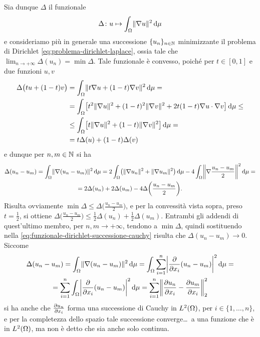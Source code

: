 Sia dunque $\Delta$ il funzionale
\begin{equation}
    \Delta\colon u\mapsto \int_\Omega\norm{\grad u}^2\,\dd\mu
\end{equation}
e consideriamo più in generale una successione $\{u_n\}_{n\in\N}$ minimizzante il problema di Dirichlet \eqref{eq:problema-dirichlet-laplace}, ossia tale che $\lim_{n\to +\infty}\Delta(u_n)=\min\Delta$.
Tale funzionale è convesso, poich\'e per $t\in[0,1]$ e due funzioni $u,v$
\begin{equation}
    \begin{split}
        \Delta\bigl(tu+(1-t)v\bigr)&=
        \int_\Omega\norm{t\grad u+(1-t)\grad v}^2\,\dd\mu=\\ &=
        \int_\Omega\bigl[t^2\norm{\grad u}^2+(1-t)^2\norm{\grad v}^2+2t(1-t)\scalar{\grad u}{\grad v}\bigr]\,\dd\mu\le\\ &\le
        \int_\Omega\bigl[t\norm{\grad u}^2+(1-t)\norm{\grad v}^2\bigr]\,\dd\mu=\\ &=
        t\Delta(u)+(1-t)\Delta(v)
    \end{split}
\end{equation}
e dunque per $n,m\in\N$ si ha
\begin{multline}
    \Delta(u_n-u_m)=
    \int_\Omega\norm{\grad(u_n-u_m)}^2\,\dd\mu=
    2\int_\Omega\bigl(\norm{\grad u_n}^2+\norm{\grad u_m}^2\bigr)\,\dd\mu-4\int_\Omega\norm[\bigg]{\grad\frac{u_n-u_m}2}^2\,\dd\mu=\\=
    2\Delta(u_n)+2\Delta(u_m)-4\Delta\biggl(\frac{u_n-u_m}2\biggr).
    \label{eq:funzionale-dirichlet-successione-cauchy}
\end{multline}
Risulta ovviamente $\min\Delta\le\Delta\bigl(\frac{u_n-u_m}2\bigr)$, e per la convessità vista sopra, preso $t=\frac12$, si ottiene $\Delta\bigl(\frac{u_n-u_m}2\bigr)\le\frac12\Delta(u_n)+\frac12\Delta(u_m)$.
Entrambi gli addendi di quest'ultimo membro, per $n,m\to+\infty$, tendono a $\min\Delta$, quindi sostituendo nella \eqref{eq:funzionale-dirichlet-successione-cauchy} risulta che $\Delta(u_n-u_m)\to 0$.
Siccome
\begin{multline}
    \Delta(u_n-u_m)=
    \int_\Omega\norm{\grad(u_n-u_m)}^2\,\dd\mu=
    \int_\Omega\sum_{i=1}^n\abs[\bigg]{\drp{}{x_i}(u_n-u_m)}^2\,\dd\mu=\\=
    \sum_{i=1}^n\int_\Omega\abs[\bigg]{\drp{}{x_i}(u_n-u_m)}^2\,\dd\mu=
    \sum_{i=1}^n\norm[\bigg]{\drp{u_n}{x_i}-\drp{u_m}{x_i}}_2^2
\end{multline}
si ha anche che $\drp{u_n}{x_i}$ forma una successione di Cauchy in $\leb[2]{\Omega}$, per $i\in\{1,\dotsc,n\}$, e per la completezza dello spazio tale successione converge\ldots\ a una funzione che è in $\leb[2]{\Omega}$, ma non è detto che sia anche solo continua.

